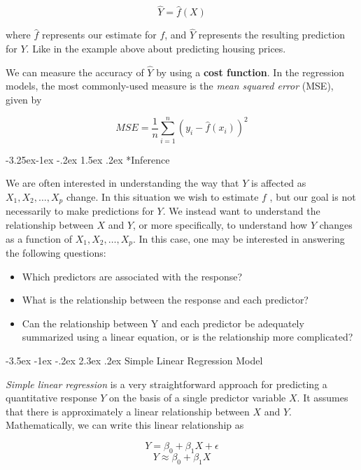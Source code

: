 \documentclass[]{book}
\makeatletter
\providecommand{\tightlist}{%
  \setlength{\itemsep}{0pt}\setlength{\parskip}{0pt}}
\renewcommand\section{\@startsection {section}{1}{\z@}%
                                   {-3.5ex \@plus -1ex \@minus -.2ex}%
                                   {2.3ex \@plus.2ex}%
                                   {\normalfont\Large\bfseries\color{ForestGreen}}}
\renewcommand\subsection{\@startsection{subsection}{2}{\z@}%
                                     {-3.25ex\@plus -1ex \@minus -.2ex}%
                                     {1.5ex \@plus .2ex}%
                                     {\normalfont\large\bfseries\color{Violet}}}
\theoremstyle{definition}
\theoremstyle{definition}
\theoremstyle{definition}
\theoremstyle{remark}
\makeatother
\begin{document}
\[ \hat{Y} = \hat{f}(X) \]

where \(\hat{f}\) represents our estimate for \(f\), and \(\hat{Y}\)
represents the resulting prediction for \(Y\). Like in the example above
about predicting housing prices.

We can measure the accuracy of \(\hat{Y}\) by using a \textbf{cost
function}. In the regression models, the most commonly-used measure is
the \emph{mean squared error} (MSE), given by

\[ MSE = \frac{1}{n} \sum_{i=1}^{n} (y_i - \hat{f}(x_i))^2\]

\subsection*{Inference}\label{inference}

We are often interested in understanding the way that \(Y\) is affected
as \(X_1 , X_2 ,\ldots, X_p\) change. In this situation we wish to
estimate \(f\) , but our goal is not necessarily to make predictions for
\(Y\). We instead want to understand the relationship between \(X\) and
\(Y\), or more specifically, to understand how \(Y\) changes as a
function of \(X_1 , X_2 ,\ldots, X_p\). In this case, one may be
interested in answering the following questions:

\begin{itemize}
\tightlist
\item
  Which predictors are associated with the response?
\item
  What is the relationship between the response and each predictor?
\item
  Can the relationship between Y and each predictor be adequately
  summarized using a linear equation, or is the relationship more
  complicated?
\end{itemize}

\section{Simple Linear Regression
Model}\label{simple-linear-regression-model}

\emph{Simple linear regression} is a very straightforward approach for
predicting a quantitative response \(Y\) on the basis of a single
predictor variable \(X\). It assumes that there is approximately a
linear relationship between \(X\) and \(Y\). Mathematically, we can
write this linear relationship as

\[ Y = \beta_0 + \beta_1 X + \epsilon \]
\[Y \approx \beta_0 + \beta_1 X\]
\end{document}
